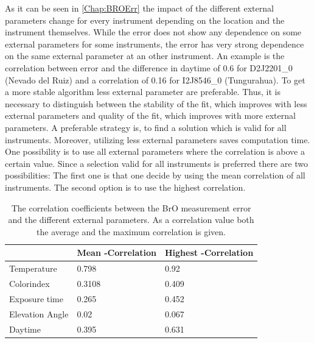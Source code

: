 \documentclass  [
  paper    = a4,
  BCOR     = 10mm,
  twoside,
  fontsize = 12pt,
  fleqn,
  toc      = bibnumbered,
  toc      = listofnumbered,
  numbers  = noendperiod,
  headings = normal,
  listof   = leveldown,
  version  = 3.03
]                                       {scrreprt}
\newcommand{\myrowcolour}{\rowcolor[gray]{0.925}}
\begin{document}
	As it can be seen in \cref{Chap:BROErr} the impact of the different external parameters change for every instrument depending on the location and the instrument themselves. 
	While the   error does not show any dependence on some external parameters for some instruments, the error has very strong dependence on the same external parameter at an other instrument. An example is the correlation between   error and the difference in daytime of 0.6 for D2J2201\_0 (Nevado del Ruiz) and a correlation of 0.16 for I2J8546\_0 (Tungurahua).
	To get a more stable algorithm less external parameter are preferable. Thus, it is necessary to distinguish between the stability of the fit, which improves with less external parameters and quality of the fit, which improves with more external parameters. 
	A preferable strategy is, to find a solution which is valid for all instruments. Moreover, utilizing less external parameters saves computation time.
	One possibility is to use all external parameters where the correlation is above a certain value. Since a selection valid for all instruments is preferred there are two possibilities: The first one is that one decide by using the mean correlation of all instruments. The second option is to use the highest correlation.
	
	\begin{table}[h]
		\centering
		\caption{The correlation coefficients between the BrO measurement error and the different external parameters. As a correlation value both the average and the maximum correlation is given.}
		\begin{tabular}{p{4cm}p{3cm}p{3cm}}
			&  Mean -Correlation&  Highest   -Correlation\\
			\toprule
			Temperature &0.798&	0.92\\
			\myrowcolour%
			Colorindex &0.3108&	0.409\\
			Exposure time &0.265&	0.452\\
			\myrowcolour%
			Elevation Angle &0.02&	0.067\\
			Daytime &0.395&	0.631\\
			\bottomrule		
		\end{tabular}
	\label{tab:CorrEP}
	\end{table}
\end{document}
